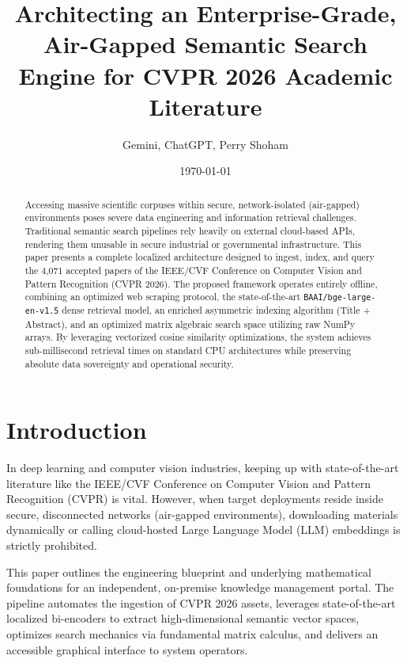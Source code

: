 \documentclass[12pt,a4paper]{article}
\title{\textbf{Architecting an Enterprise-Grade, Air-Gapped Semantic Search Engine for CVPR 2026 Academic Literature}}
\author{Gemini, ChatGPT, Perry Shoham}
\date{\today}
\begin{document}
\maketitle

\begin{abstract}
Accessing massive scientific corpuses within secure, network-isolated (air-gapped) environments poses severe data engineering and information retrieval challenges. Traditional semantic search pipelines rely heavily on external cloud-based APIs, rendering them unusable in secure industrial or governmental infrastructure. This paper presents a complete localized architecture designed to ingest, index, and query the 4,071 accepted papers of the IEEE/CVF Conference on Computer Vision and Pattern Recognition (CVPR 2026). The proposed framework operates entirely offline, combining an optimized web scraping protocol, the state-of-the-art \texttt{BAAI/bge-large-en-v1.5} dense retrieval model, an enriched asymmetric indexing algorithm (Title + Abstract), and an optimized matrix algebraic search space utilizing raw NumPy arrays. By leveraging vectorized cosine similarity optimizations, the system achieves sub-millisecond retrieval times on standard CPU architectures while preserving absolute data sovereignty and operational security.
\end{abstract}

\newpage
\tableofcontents
\newpage

\section{Introduction}
In deep learning and computer vision industries, keeping up with state-of-the-art literature like the IEEE/CVF Conference on Computer Vision and Pattern Recognition (CVPR) is vital. However, when target deployments reside inside secure, disconnected networks (air-gapped environments), downloading materials dynamically or calling cloud-hosted Large Language Model (LLM) embeddings is strictly prohibited. 

This paper outlines the engineering blueprint and underlying mathematical foundations for an independent, on-premise knowledge management portal. The pipeline automates the ingestion of CVPR 2026 assets, leverages state-of-the-art localized bi-encoders to extract high-dimensional semantic vector spaces, optimizes search mechanics via fundamental matrix calculus, and delivers an accessible graphical interface to system operators.
\end{document}
